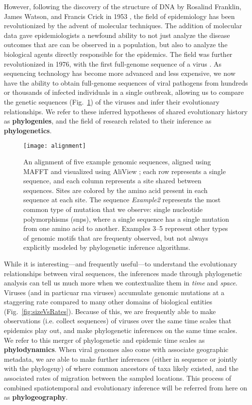 However, following the discovery of the structure of DNA by Rosalind Franklin, James Watson, and Francis Crick in 1953 \citep{franklin1953molecular,watson1953molecular}, the field of epidemiology has been revolutionized by the advent of molecular techniques.
The addition of molecular data gave epidemiologists a newfound ability to not just analyze the disease outcomes that are can be observed in a population, but also to analyze the biological agents directly responsible for the epidemics.
The field was further revolutionized in 1976, with the first full-genome sequence of a virus \citep{fiers1976complete}.
As sequencing technology has become more advanced and less expensive, we now have the ability to obtain full-genome sequences of viral pathogens from hundreds or thousands of infected individuals in a single outbreak, allowing us to compare the genetic sequences (Fig.~\ref{fig:alignment}) of the viruses and infer their evolutionary relationships.
We refer to these inferred hypotheses of shared evolutionary history as \textbf{phylogenies}, and the field of research related to their inference as \textbf{phylogenetics}.\\

\begin{figure}[ht]
  \centering
  \texttt{[image: alignment]}
  \caption[Multiple sequence alignment]{An alignment of five example genomic sequences, aligned using MAFFT  and visualized using AliView ; each row represents a single sequence, and each column represents a site shared between sequences. Sites are colored by the amino acid present in each sequence at each site. The sequence \textit{Example2} represents the most common type of mutation that we observe: single nucleotide polymorphisms (\gls{snp}s), where a single sequence has a single mutation from one amino acid to another. Examples 3--5 represent other types of genomic motifs that are frequenty observed, but not always explicitly modeled by phylogenetic inference algorithms.}
  \label{fig:alignment}
\end{figure}

While it is interesting---and frequently useful---to understand the evolutionary relationships between viral sequences, the inferences made through phylogenetic analysis can tell us much more when we contextualize them in \textit{time} and \textit{space}.
Viruses (and in particuar \gls{rna} viruses) accumulate genomic mutations at a staggering rate compared to many other domains of biological entities (Fig.~\ref{fig:sizeVsRates}).
Because of this, we are frequently able to make observations (i.e. collect sequences) of viruses over the same time scales that epidemics play out, and make phylogenetic inferences on the same time scales.
We refer to this merger of phylogenetic and epidemic time scales as \textbf{phylodynamics}.
When viral genomes also come with associate geographic metadata, we are able to make further inferences (either in sequence or jointly with the phylogeny) of where common ancestors of taxa likely existed, and the associated rates of migration between the sampled locations.
This process of combined spatiotemporal and evolutionary inference will be referred from here on as \textbf{phylogeography}.\\

